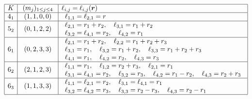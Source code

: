 \documentclass[11pt]{amsart}
\newcommand{\br}{{\boldsymbol r}}
\theoremstyle{definition}
\newcommand{\1}{{\mathbf 1}}
\numberwithin{equation}{section}
\begin{document}
\begin{figure}[h]
  \centering
  \begin{equation*}
    \begin{array}{|c|c|l|l|}
      \hline
      K & (m_j)_{1 \leq j \leq 4} & \ell_{i,j} = \ell_{i,j}(\br) \\ \hline

      4_1 &
      \begin{array}{l}
        (1, 1, 0, 0)
      \end{array} & 
      \begin{array}{l}
        \ell_{1,1} = \ell_{2,1} = r
      \end{array} \\ \hline

      5_2 &
      \begin{array}{l}
        (0, 1, 2, 2)
      \end{array} & 
      \begin{array}{l}
        \ell_{2,1}=r_1+r_2,\quad \ell_{3,1}=r_1+r_2 \\
        \ell_{3,2}=\ell_{4,1}=r_2,\quad \ell_{4,2}=r_1 \\
      \end{array} \\ \hline

      6_1 &
      \begin{array}{l}
        (0, 2, 3, 3)
      \end{array} & 
      \begin{array}{l}
        \ell_{2,1}=r_1+r_2,\quad \ell_{2,2}=r_1+r_2+r_3 \\
        \ell_{3,1}=r_1,\quad \ell_{3,2}=r_1+r_2,\quad \ell_{3,3}=r_1+r_2+r_3 \\
        \ell_{4,1}=r_1,\quad \ell_{4,2}=r_2,\quad \ell_{4,3}=r_3
      \end{array} \\ \hline

      6_2 &
      \begin{array}{l}
        (2, 1, 2, 3)
      \end{array} & 
      \begin{array}{l}
        \ell_{1,1}=r_1,\quad \ell_{1,2}=r_2+r_3,\quad \ell_{2,1}=r_1 \\
        \ell_{3,1}=\ell_{4,1}=r_2,\quad \ell_{3,2}=r_3,\quad \ell_{4,2}=r_1-r_2,\quad \ell_{4,3}=r_2+r_3
      \end{array} \\ \hline

      6_3 &
      \begin{array}{l}
        (1, 1, 3, 3)
      \end{array} & 
      \begin{array}{l}
        \ell_{1,1}=\ell_{2,1}=r_2,\quad \ell_{3,1}=\ell_{4,1}=r_1 \\
        \ell_{3,2}=\ell_{4,2}=r_3,\quad \ell_{3,3}=r_2-r_3,\quad \ell_{4,3}=r_2-r_1
      \end{array} \\ \hline


\end{array}
\end{equation*}
\end{figure}
\end{document}
